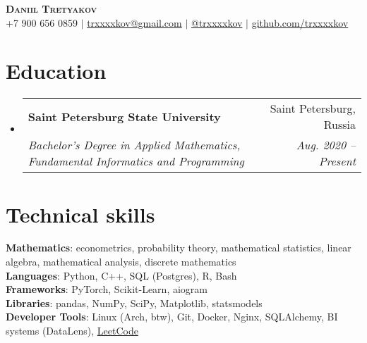 \documentclass[a4paper, 11pt]{article}
\makeatletter
\newcommand{\resumeSubheading}[4]{
  \vspace{-2pt}\item
    \begin{tabular*}{0.97\textwidth}[t]{l@{\extracolsep{\fill}}r}
      \textbf{#1} & #2 \\
      \textit{\small#3} & \textit{\small #4} \\
    \end{tabular*}\vspace{-7pt}
}
\newcommand{\resumeSubHeadingListStart}{\begin{itemize}[leftmargin=0.15in, label={}]}
\newcommand{\resumeSubHeadingListEnd}{\end{itemize}}
\makeatother
\begin{document}
\begin{center}
    \textbf{\Huge \scshape Daniil Tretyakov} \\ \vspace{1pt}
    \small +7 900 656 0859 $|$ \href{mailto:trxxxxkov@gmail.com}{trxxxxkov@gmail.com} $|$ 
    \href{https://t.me/trxxxxkov}{@trxxxxkov} $|$
    \href{https://github.com/trxxxxkov}{github.com/trxxxxkov}
\end{center}


\section{Education}
  \resumeSubHeadingListStart
    \resumeSubheading
      {Saint Petersburg State University}{Saint Petersburg, Russia}
      {Bachelor's Degree in Applied Mathematics, Fundamental Informatics and Programming}
      {Aug. 2020 -- Present}
  \resumeSubHeadingListEnd


\section{Technical skills}
 \begin{itemize}[leftmargin=0.15in, label={}]
    \small{\item{
        \textbf{Mathematics}{: econometrics, probability theory, mathematical statistics, linear algebra, mathematical analysis, discrete mathematics} \\    
        \vspace{3pt}
        \textbf{Languages}{: Python, C++, SQL (Postgres), R, Bash} \\
        \vspace{3pt}
        \textbf{Frameworks}{: PyTorch, Scikit-Learn, aiogram} \\
        \vspace{3pt}
        \textbf{Libraries}{: pandas, NumPy, SciPy, Matplotlib, statsmodels} \\
        \vspace{3pt}
        \textbf{Developer Tools}{: Linux (Arch, btw), Git, Docker, Nginx, SQLAlchemy, BI systems (DataLens),  \href{https://leetcode.com/u/trxxxxkov/}{LeetCode}} \\
    }}
 \end{itemize}

\end{document}
